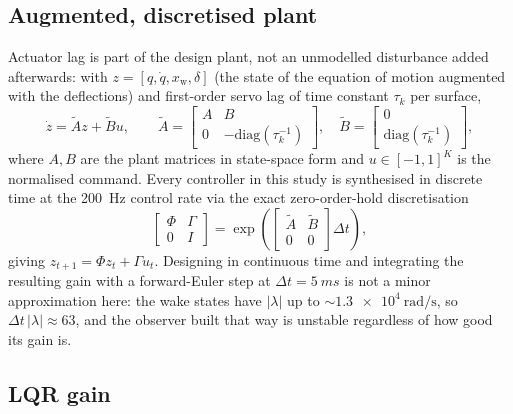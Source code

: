 \documentclass[11pt]{article}
\begin{document}
\subsection*{Augmented, discretised plant}

Actuator lag is part of the design plant, not an unmodelled disturbance
added afterwards: with $z=[q,\dot q, x_{\mathrm{w}}, \delta]$ (the state of
the equation of motion augmented with the deflections) and first-order
servo lag of time constant $\tau_k$ per surface,
\begin{equation}
\dot z = \tilde A z + \tilde B u, \qquad
\tilde A = \begin{bmatrix} A & B \\ 0 & -\mathrm{diag}(\tau_k^{-1}) \end{bmatrix},
\quad
\tilde B = \begin{bmatrix} 0 \\ \mathrm{diag}(\tau_k^{-1}) \end{bmatrix},
\label{eq:augplant}
\end{equation}
where $A,B$ are the plant matrices in state-space form and
$u\in[-1,1]^K$ is the normalised command. Every controller in this study is
synthesised in discrete time at the \SI{200}{\hertz} control rate via the exact
zero-order-hold discretisation
\begin{equation}
\begin{bmatrix} \Phi & \Gamma \\ 0 & I \end{bmatrix}
= \exp\!\left( \begin{bmatrix} \tilde A & \tilde B \\ 0 & 0 \end{bmatrix} \Delta t \right),
\label{eq:zoh}
\end{equation}
giving $z_{t+1} = \Phi z_t + \Gamma u_t$. Designing in continuous time and
integrating the resulting gain with a forward-Euler step at $\Delta t=\SI{5}{ms}$
is not a minor approximation here: the wake states have $|\lambda|$ up to
$\sim\!\SI{1.3e4}{\radian\per\second}$, so $\Delta t\,|\lambda|\approx 63$, and
the observer built that way is unstable regardless of how good its gain is.

\subsection*{LQR gain}
\end{document}

